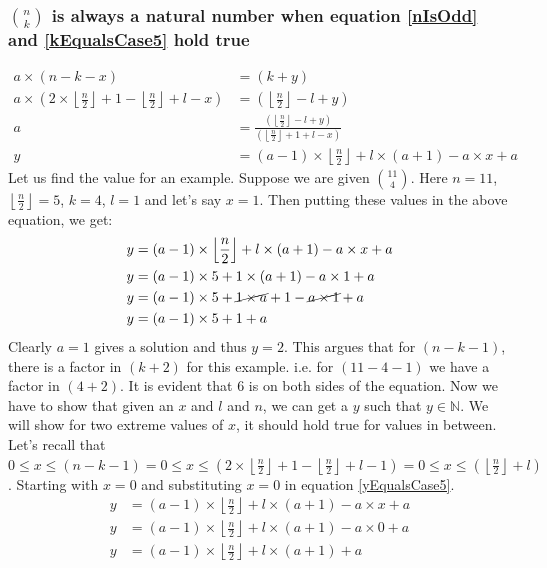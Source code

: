\documentclass[10pt, twoside]{article}
\newcommand*{\Combination}[2]{\binom{#1}{#2}}%
\newcommand{\floordivision}[2]{\left\lfloor \frac{#1}{#2} \right\rfloor}
\begin{document}
\subsubsection{$\Combination{n}{k}$ is always a natural number when equation \eqref{nIsOdd} and \eqref{kEqualsCase5} hold true}\label{ProofkEqualsCase5}
\begin{align}
	a \times (n-k-x) &= (k+y) \nonumber \\
	a \times (2\times \floordivision{n}{2} + 1 - \floordivision{n}{2} +l - x) &= (\floordivision{n}{2} -l + y) \nonumber \\
	a &= \frac{(\floordivision{n}{2} -l + y)}{(\floordivision{n}{2} + 1 +l - x)} \nonumber \\
	y &= (a-1)\times \floordivision{n}{2} + l\times(a+1) - a\times x + a \label{yEqualsCase5}	
\end{align}
Let us find the value for an example. Suppose we are given $\Combination{11}{4}$. Here $n=11$, $\floordivision{n}{2}=5$, $k=4$, $l=1$ and let's say $x=1$. Then putting these values in the above equation, we get:
\begin{align*}
	y &= (a-1)\times \floordivision{n}{2} + l\times(a+1) - a\times x + a \\
	y &= (a-1)\times 5 + 1\times(a+1) - a\times 1 + a \\
	y &= (a-1)\times 5 + \cancel{1\times a}+ 1 - \cancel{a\times 1} + a \\
	y &= (a-1)\times 5 + 1 + a \\
\end{align*}
Clearly $a=1$ gives a solution and thus $y=2$. This argues that for $(n-k-1)$, there is a factor in $(k+2)$ for this example. i.e. for $(11-4-1)$ we have a factor in $(4+2)$. It is evident that $6$ is on both sides of the equation.\newline
Now we have to show that given an $x$ and $l$ and $n$, we can get a $y$ such that $y \in \mathbb{N}$. We will show for two extreme values of $x$, it should hold true for values in between.\newline
Let's recall that $0 \leq x \leq (n-k-1) = 0 \leq x \leq (2\times \floordivision{n}{2}+1-\floordivision{n}{2}+l-1) = 0 \leq x \leq (\floordivision{n}{2} + l)$. Starting with $x=0$ and substituting $x=0$ in equation \eqref{yEqualsCase5}.
\begin{align*}
	y &= (a-1)\times \floordivision{n}{2} + l\times(a+1) - a\times x + a \\
	y &= (a-1)\times \floordivision{n}{2} + l\times(a+1) - a\times 0 + a \\	
	y &= (a-1)\times \floordivision{n}{2} + l\times(a+1) + a \\		
\end{align*}
\end{document}
